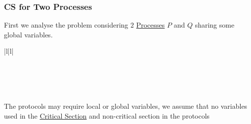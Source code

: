 \subsubsection{CS for Two Processes}\label{sub:cp_cs_for_two_processes} %
First we analyse the problem considering $2$ \hyperref[def:process]{Processes} $P$ and $Q$ sharing some global variables.
\begin{ctable}{|l|l|}
    \hline
     \\
    \hline
     \\
    \hline
     \\
     \\
     \\
    \hline
\end{ctable}
\begin{note}
    The protocols may require local or global variables, we assume that no variables used in the \hyperref[def:crit-sec]{Critical Section} and non-critical section  in the protocols
\end{note}
